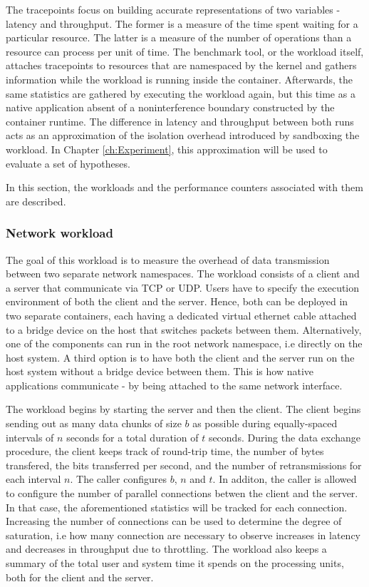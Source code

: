 The tracepoints focus on building accurate representations of two variables - latency and throughput. 
The former is a measure of the time spent waiting for a particular resource. The latter 
is a measure of the number of operations than a resource can process per unit of time.
The benchmark tool, or the workload itself, attaches tracepoints to resources 
that are namespaced by the kernel and gathers information while the workload is running inside 
the container. Afterwards, the same statistics are gathered by executing the workload again, but this time 
as a native application absent of a noninterference boundary constructed by the container runtime. 
The difference in latency and throughput between both runs acts as an approximation of the isolation 
overhead introduced by sandboxing the workload. In Chapter \ref{ch:Experiment}, this approximation will be used 
to evaluate a set of hypotheses. 

In this section, the workloads and the performance counters associated with them are described. 

\subsubsection{Network workload}
The goal of this workload is to measure the overhead of data transmission between 
two separate network namespaces. The workload consists of a client and a server that communicate 
via TCP or UDP. Users have to specify the execution environment of both the client 
and the server. Hence, both can be deployed in two separate containers, each having a dedicated
virtual ethernet cable attached to a bridge device on the host that switches packets between them.
Alternatively, one of the components can run 
in the root network namespace, i.e directly on the host system. A third option is to have both 
the client and the server run on the host system without a bridge device between them. This is how 
native applications communicate - by being attached to the same network interface. 

The workload begins by starting the server and then the client. The client begins sending out as many 
data chunks of size $b$ as possible during equally-spaced intervals of $n$ seconds for a total 
duration of $t$ seconds.
During the data exchange procedure, the client keeps track of round-trip time, the number 
of bytes transfered, the bits transferred per second, and the number of retransmissions for each interval $n$. 
The caller configures $b$, $n$ and $t$. In additon, the caller is allowed to configure the number 
of parallel connections betwen the client and the server. In that case, the aforementioned 
statistics will be tracked for each connection. Increasing the number of connections can be used to
determine the degree of saturation, i.e how many connection are necessary to 
observe increases in latency and decreases in throughput due to throttling.
The workload also keeps a summary of the total user and system time it spends on the processing units,
both for the client and the server.

